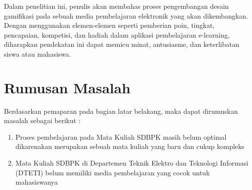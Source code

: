 



Dalam penelitian ini, penulis akan membahas proses pengembangan desain gamifikasi pada sebuah media pembelajaran elektronik yang akan dikembangkan.
Dengan menggunakan elemen-elemen seperti pemberian poin, tingkat, pencapaian, kompetisi, dan hadiah dalam aplikasi pembelajaran e-learning, diharapkan pendekatan ini dapat memicu minat, antusiasme, dan keterlibatan siswa atau mahasiswa.


\section{Rumusan Masalah}
Berdasarkan pemaparan pada bagian latar belakang, maka dapat dirumuskan masalah sebagai berikut :
\begin{enumerate}
	\item Proses pembelajaran pada Mata Kuliah SDBPK masih belum optimal dikarenakan merupakan sebuah mata kuliah yang baru dan cukup kompleks
	\item Mata Kuliah SDBPK di Departemen Teknik Elektro dan Teknologi Informasi (DTETI) belum memiliki media pembelajaran yang cocok untuk mahasiswanya
\end{enumerate}

